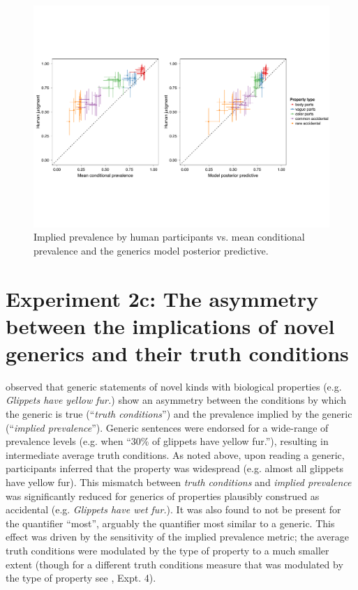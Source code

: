 \documentclass[10pt,letterpaper]{article}
\begin{document}
\begin{figure}
\centering
    \includegraphics[width=\columnwidth]{implied-byItem-mcp-pp}
    \caption{Implied prevalence by human participants vs. mean conditional prevalence and the generics model posterior predictive.}
  \label{fig:byItemScatter}
\end{figure}


\section{Experiment 2c: The asymmetry between the implications of novel generics and their truth conditions}

 observed that generic statements of novel kinds with biological properties (e.g. \emph{Glippets have yellow fur.}) show an asymmetry between the conditions by which the generic is true (``\emph{truth conditions}'') and the prevalence implied by the generic (``\emph{implied prevalence}''). 
Generic sentences were endorsed for a wide-range of prevalence levels (e.g. when ``30\% of glippets have yellow fur.''), resulting in intermediate average truth conditions. 
As noted above, upon reading a generic, participants inferred that the property was widespread (e.g. almost all glippets have yellow fur).
This mismatch between \emph{truth conditions} and \emph{implied prevalence} was significantly reduced for generics of properties plausibly construed as accidental (e.g. \emph{Glippets have wet fur.}).
It was also found to not be present for the quantifier ``most'', arguably the quantifier most similar to a generic.
This effect was driven by the sensitivity of the implied prevalence metric; the average truth conditions were modulated by the type of property to a much smaller extent (though for a different truth conditions measure that was modulated by the type of property see , Expt. 4).
\end{document}
